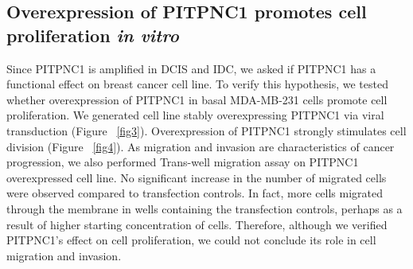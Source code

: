 \documentclass[10pt,letterpaper]{article}
\begin{document}
\subsection*{Overexpression of PITPNC1 promotes cell proliferation \textit{in vitro}}
Since PITPNC1 is amplified in DCIS and IDC, we asked if PITPNC1 has a functional effect on breast cancer cell line. To verify this hypothesis, we tested whether overexpression of PITPNC1 in basal MDA-MB-231 cells promote cell proliferation. We generated cell line stably overexpressing PITPNC1 via viral transduction (Figure ~\ref{fig3}). Overexpression of PITPNC1 strongly stimulates cell division (Figure ~\ref{fig4}). As migration and invasion are characteristics of cancer progression, we also performed Trans-well migration assay on PITPNC1 overexpressed cell line. No significant increase in the number of migrated cells were observed compared to transfection controls. In fact, more cells migrated through the membrane in wells containing the transfection controls, perhaps as a result of higher starting concentration of cells. Therefore, although we verified PITPNC1’s effect on cell proliferation, we could not conclude its role in cell migration and invasion.
\end{document}

